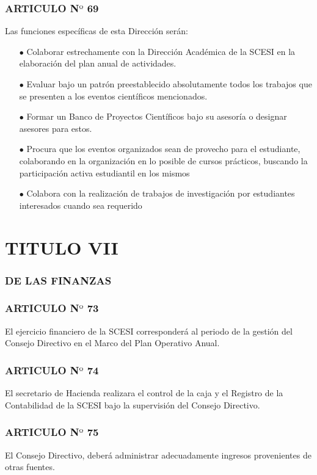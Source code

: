 \documentclass[letterpaper,11pt]{book}
\begin{document}
\begin{itemize}
\subsubsection*{ARTICULO N$º$ 69}
Las funciones específicas de esta Dirección serán:
\begin{itemize}
\item[$\bullet$] Colaborar estrechamente con la Dirección Académica de la SCESI en la elaboración del plan anual de actividades. 
\item[$\bullet$] Evaluar bajo un patrón preestablecido absolutamente todos los trabajos que se presenten a los eventos científicos mencionados. 
\item[$\bullet$] Formar un Banco de Proyectos Científicos bajo su asesoría o designar asesores para estos. 
\item[$\bullet$] Procura que los eventos organizados sean de provecho para el estudiante, colaborando en la organización en lo posible de cursos prácticos, buscando la participación activa estudiantil en los mismos 
\item[$\bullet$] Colabora con la realización de trabajos de investigación por estudiantes interesados cuando sea requerido 
\end{itemize}
\end{itemize}
\section*{TITULO VII}
\subsubsection*{DE LAS FINANZAS}
\subsubsection*{ARTICULO N$º$ 73}
El ejercicio financiero de la SCESI corresponderá al periodo de la gestión del Consejo Directivo en el Marco del Plan Operativo Anual. 
\subsubsection*{ARTICULO N$º$ 74}
El secretario de Hacienda realizara el control de la caja y el Registro de la Contabilidad de la SCESI bajo la supervisión del Consejo Directivo. 
\subsubsection*{ARTICULO N$º$ 75}
El Consejo Directivo, deberá administrar adecuadamente ingresos provenientes de otras fuentes.
\end{document}
